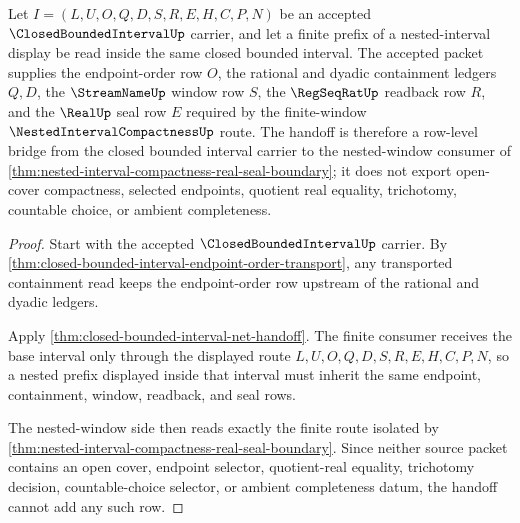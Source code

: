 \begin{theorem}
\label{thm:closed-bounded-interval-nested-compactness-handoff}
Let $I=(L,U,O,Q,D,S,R,E,H,C,P,N)$ be an accepted $\ClosedBoundedIntervalUp$ carrier, and let a finite prefix of a nested-interval display be read inside the same closed bounded interval. The accepted packet supplies the endpoint-order row $O$, the rational and dyadic containment ledgers $Q,D$, the $\StreamNameUp$ window row $S$, the $\RegSeqRatUp$ readback row $R$, and the $\RealUp$ seal row $E$ required by the finite-window $\NestedIntervalCompactnessUp$ route. The handoff is therefore a row-level bridge from the closed bounded interval carrier to the nested-window consumer of \autoref{thm:nested-interval-compactness-real-seal-boundary}; it does not export open-cover compactness, selected endpoints, quotient real equality, trichotomy, countable choice, or ambient completeness.
\end{theorem}
\begin{proof}
Start with the accepted $\ClosedBoundedIntervalUp$ carrier. By \autoref{thm:closed-bounded-interval-endpoint-order-transport}, any transported containment read keeps the endpoint-order row upstream of the rational and dyadic ledgers.

Apply \autoref{thm:closed-bounded-interval-net-handoff}. The finite consumer receives the base interval only through the displayed route $L,U,O,Q,D,S,R,E,H,C,P,N$, so a nested prefix displayed inside that interval must inherit the same endpoint, containment, window, readback, and seal rows.

The nested-window side then reads exactly the finite route isolated by \autoref{thm:nested-interval-compactness-real-seal-boundary}. Since neither source packet contains an open cover, endpoint selector, quotient-real equality, trichotomy decision, countable-choice selector, or ambient completeness datum, the handoff cannot add any such row.
\end{proof}

